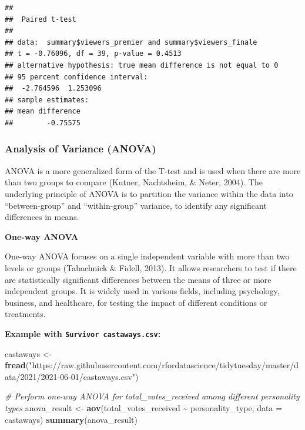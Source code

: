 \documentclass[
  b5paper]{book}
\newenvironment{Shaded}{\begin{snugshade}}{\end{snugshade}}
\newcommand{\AttributeTok}[1]{\textcolor[rgb]{0.13,0.29,0.53}{#1}}
\newcommand{\CommentTok}[1]{\textcolor[rgb]{0.56,0.35,0.01}{\textit{#1}}}
\newcommand{\FunctionTok}[1]{\textcolor[rgb]{0.13,0.29,0.53}{\textbf{#1}}}
\newcommand{\NormalTok}[1]{#1}
\newcommand{\OtherTok}[1]{\textcolor[rgb]{0.56,0.35,0.01}{#1}}
\newcommand{\SpecialCharTok}[1]{\textcolor[rgb]{0.81,0.36,0.00}{\textbf{#1}}}
\newcommand{\StringTok}[1]{\textcolor[rgb]{0.31,0.60,0.02}{#1}}
\begin{document}
\begin{verbatim}
## 
##  Paired t-test
## 
## data:  summary$viewers_premier and summary$viewers_finale
## t = -0.76096, df = 39, p-value = 0.4513
## alternative hypothesis: true mean difference is not equal to 0
## 95 percent confidence interval:
##  -2.764596  1.253096
## sample estimates:
## mean difference 
##        -0.75575
\end{verbatim}

\hypertarget{analysis-of-variance-anova}{%
\subsubsection*{Analysis of Variance (ANOVA)}\label{analysis-of-variance-anova}}

ANOVA is a more generalized form of the T-test and is used when there are more than two groups to compare (Kutner, Nachtsheim, \& Neter, 2004). The underlying principle of ANOVA is to partition the variance within the data into ``between-group'' and ``within-group'' variance, to identify any significant differences in means.

\textbf{One-way ANOVA}

One-way ANOVA focuses on a single independent variable with more than two levels or groups (Tabachnick \& Fidell, 2013). It allows researchers to test if there are statistically significant differences between the means of three or more independent groups. It is widely used in various fields, including psychology, business, and healthcare, for testing the impact of different conditions or treatments.

\textbf{Example with \texttt{Survivor\ castaways.csv}:}

\begin{Shaded}
\begin{Highlighting}[]
\NormalTok{castaways }\OtherTok{\textless{}{-}} \FunctionTok{fread}\NormalTok{(}\StringTok{"https://raw.githubusercontent.com/rfordatascience/tidytuesday/master/data/2021/2021{-}06{-}01/castaways.csv"}\NormalTok{)}


\CommentTok{\# Perform one{-}way ANOVA for total\_votes\_received among different personality types}
\NormalTok{anova\_result }\OtherTok{\textless{}{-}} \FunctionTok{aov}\NormalTok{(total\_votes\_received }\SpecialCharTok{\textasciitilde{}}\NormalTok{ personality\_type, }\AttributeTok{data =}\NormalTok{ castaways)}
\FunctionTok{summary}\NormalTok{(anova\_result)}
\end{Highlighting}
\end{Shaded}
\end{document}
